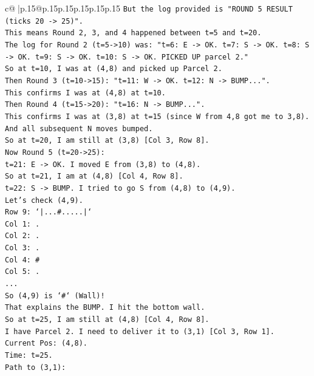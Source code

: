\documentclass{article}
\begin{document}
{\begin{supertabular}{c@{$\;$}|p{.15\linewidth}@{}p{.15\linewidth}p{.15\linewidth}p{.15\linewidth}p{.15\linewidth}p{.15\linewidth}}
{{{\texttt{But the log provided is "ROUND 5 RESULT (ticks 20 {-}> 25)".} \\
\texttt{This means Round 2, 3, and 4 happened between t=5 and t=20.} \\
\texttt{The log for Round 2 (t=5{-}>10) was: "t=6: E {-}> OK. t=7: S {-}> OK. t=8: S {-}> OK. t=9: S {-}> OK. t=10: S {-}> OK. PICKED UP parcel 2."} \\
\texttt{So at t=10, I was at (4,8) and picked up Parcel 2.} \\
\texttt{Then Round 3 (t=10{-}>15): "t=11: W {-}> OK. t=12: N {-}> BUMP...".} \\
\texttt{This confirms I was at (4,8) at t=10.} \\
\texttt{Then Round 4 (t=15{-}>20): "t=16: N {-}> BUMP...".} \\
\texttt{This confirms I was at (3,8) at t=15 (since W from 4,8 got me to 3,8).} \\
\texttt{And all subsequent N moves bumped.} \\
\texttt{So at t=20, I am still at (3,8) {[}Col 3, Row 8{]}.} \\
\texttt{Now Round 5 (t=20{-}>25):} \\
\texttt{t=21: E {-}> OK. I moved E from (3,8) to (4,8).} \\
\texttt{So at t=21, I am at (4,8) {[}Col 4, Row 8{]}.} \\
\texttt{t=22: S {-}> BUMP. I tried to go S from (4,8) to (4,9).} \\
\texttt{Let's check (4,9).} \\
\texttt{Row 9: `|...\#.....|`} \\
\texttt{Col 1: .} \\
\texttt{Col 2: .} \\
\texttt{Col 3: .} \\
\texttt{Col 4: \#} \\
\texttt{Col 5: .} \\
\texttt{...} \\
\texttt{So (4,9) is `\#` (Wall)!} \\
\texttt{That explains the BUMP. I hit the bottom wall.} \\
\texttt{So at t=25, I am still at (4,8) {[}Col 4, Row 8{]}.} \\
\texttt{I have Parcel 2. I need to deliver it to (3,1) {[}Col 3, Row 1{]}.} \\
\texttt{Current Pos: (4,8).} \\
\texttt{Time: t=25.} \\
\texttt{Path to (3,1):} \\
}}}
\end{supertabular}}
\end{document}
